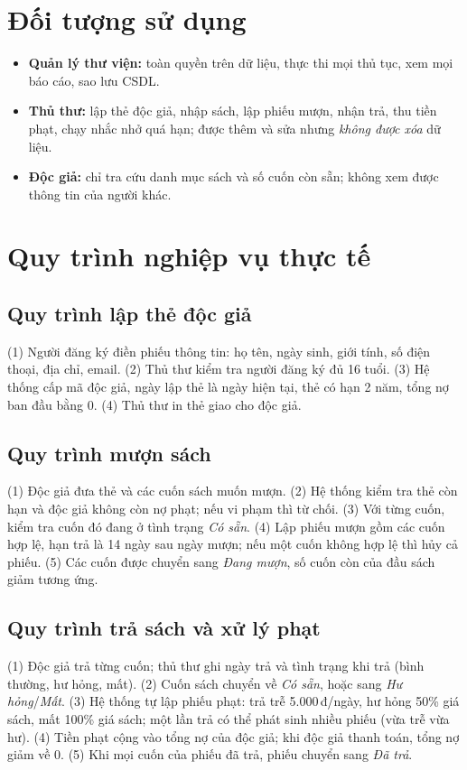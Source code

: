 \documentclass[a4paper,oneside]{report}
\begin{document}
\section{Đối tượng sử dụng}
\begin{itemize}
\item \textbf{Quản lý thư viện:} toàn quyền trên dữ liệu, thực thi mọi thủ tục, xem mọi báo cáo, sao lưu CSDL.
\item \textbf{Thủ thư:} lập thẻ độc giả, nhập sách, lập phiếu mượn, nhận trả, thu tiền phạt, chạy nhắc nhở quá hạn; được thêm và sửa nhưng \emph{không được xóa} dữ liệu.
\item \textbf{Độc giả:} chỉ tra cứu danh mục sách và số cuốn còn sẵn; không xem được thông tin của người khác.
\end{itemize}

\section{Quy trình nghiệp vụ thực tế}
\subsection{Quy trình lập thẻ độc giả}
(1) Người đăng ký điền phiếu thông tin: họ tên, ngày sinh, giới tính, số điện thoại, địa chỉ, email. (2) Thủ thư kiểm tra người đăng ký đủ 16 tuổi. (3) Hệ thống cấp mã độc giả, ngày lập thẻ là ngày hiện tại, thẻ có hạn 2 năm, tổng nợ ban đầu bằng 0. (4) Thủ thư in thẻ giao cho độc giả.

\subsection{Quy trình mượn sách}
(1) Độc giả đưa thẻ và các cuốn sách muốn mượn. (2) Hệ thống kiểm tra thẻ còn hạn và độc giả không còn nợ phạt; nếu vi phạm thì từ chối. (3) Với từng cuốn, kiểm tra cuốn đó đang ở tình trạng \emph{Có sẵn}. (4) Lập phiếu mượn gồm các cuốn hợp lệ, hạn trả là 14 ngày sau ngày mượn; nếu một cuốn không hợp lệ thì hủy cả phiếu. (5) Các cuốn được chuyển sang \emph{Đang mượn}, số cuốn còn của đầu sách giảm tương ứng.

\subsection{Quy trình trả sách và xử lý phạt}
(1) Độc giả trả từng cuốn; thủ thư ghi ngày trả và tình trạng khi trả (bình thường, hư hỏng, mất). (2) Cuốn sách chuyển về \emph{Có sẵn}, hoặc sang \emph{Hư hỏng}/\emph{Mất}. (3) Hệ thống tự lập phiếu phạt: trả trễ 5.000\,đ/ngày, hư hỏng 50\% giá sách, mất 100\% giá sách; một lần trả có thể phát sinh nhiều phiếu (vừa trễ vừa hư). (4) Tiền phạt cộng vào tổng nợ của độc giả; khi độc giả thanh toán, tổng nợ giảm về 0. (5) Khi mọi cuốn của phiếu đã trả, phiếu chuyển sang \emph{Đã trả}.
\end{document}
